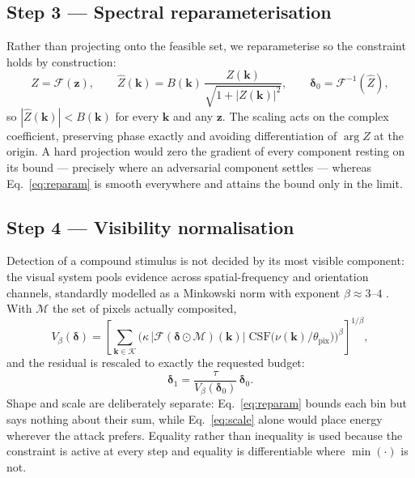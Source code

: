 \subsection{Step 3 — Spectral reparameterisation \hfill{\normalfont[novel]}}

Rather than projecting onto the feasible set, we reparameterise so the
constraint holds by construction:
\begin{equation}
  Z=\mathcal{F}(\mathbf{z}),\qquad
  \hat{Z}(\mathbf{k})=B(\mathbf{k})\,
  \frac{Z(\mathbf{k})}{\sqrt{1+|Z(\mathbf{k})|^{2}}},\qquad
  \boldsymbol{\delta}_0=\mathcal{F}^{-1}(\hat{Z}),
  \label{eq:reparam}
\end{equation}
so $|\hat{Z}(\mathbf{k})|<B(\mathbf{k})$ for every $\mathbf{k}$ and any
$\mathbf{z}$. The scaling acts on the complex coefficient, preserving
phase exactly and avoiding differentiation of $\arg Z$ at the origin. A
hard projection would zero the gradient of every component resting on
its bound --- precisely where an adversarial component settles ---
whereas Eq.~\eqref{eq:reparam} is smooth everywhere and attains the
bound only in the limit.

\subsection{Step 4 — Visibility normalisation}

Detection of a compound stimulus is not decided by its most visible
component: the visual system pools evidence across spatial-frequency and
orientation channels, standardly modelled as a Minkowski norm with
exponent $\beta\approx3\text{--}4$
\citep{quick1974,robson1981,watson1979}. With $\mathcal{M}$ the set of
pixels actually composited,
\begin{equation}
  V_\beta(\boldsymbol{\delta})=
  \left[\sum_{\mathbf{k}\in\mathcal{K}}
  \Big(\kappa\,\big|\mathcal{F}(\boldsymbol{\delta}\odot\mathcal{M})(\mathbf{k})\big|\;
  \mathrm{CSF}\big(\nu(\mathbf{k})/\theta_{\mathrm{pix}}\big)\Big)^{\beta}
  \right]^{1/\beta},
  \label{eq:visibility}
\end{equation}
and the residual is rescaled to exactly the requested budget:
\begin{equation}
  \boldsymbol{\delta}_1=\frac{\tau}{V_\beta(\boldsymbol{\delta}_0)}\,\boldsymbol{\delta}_0 .
  \label{eq:scale}
\end{equation}
Shape and scale are deliberately separate: Eq.~\eqref{eq:reparam} bounds
each bin but says nothing about their sum, while Eq.~\eqref{eq:scale}
alone would place energy wherever the attack prefers. Equality rather
than inequality is used because the constraint is active at every step
and equality is differentiable where $\min(\cdot)$ is not.

